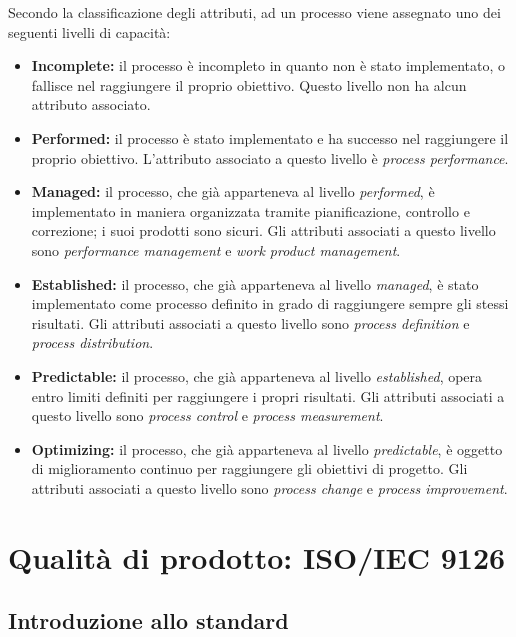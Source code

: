 \documentclass[openany,12pt,a4paper]{report}
\begin{document}
Secondo la classificazione degli attributi, ad un processo viene assegnato uno dei seguenti livelli di capacità:

\begin{itemize}
    \item \textbf{Incomplete:} il processo è incompleto in quanto non è stato implementato, o fallisce nel raggiungere il proprio obiettivo. Questo livello non ha alcun attributo associato.
    \item \textbf{Performed:} il processo è stato implementato e ha successo nel raggiungere il proprio obiettivo. L'attributo associato a questo livello è \textit{process performance}.
    \item \textbf{Managed:} il processo, che già apparteneva al livello \textit{performed}, è implementato in maniera organizzata tramite pianificazione, controllo e correzione; i suoi prodotti sono sicuri. Gli attributi associati a questo livello sono \textit{performance management} e \textit{work product management}.
    \item \textbf{Established:} il processo, che già apparteneva al livello \textit{managed}, è stato implementato come processo definito in grado di raggiungere sempre gli stessi risultati. Gli attributi associati a questo livello sono \textit{process definition} e \textit{process distribution}.
    \item \textbf{Predictable:} il processo, che già apparteneva al livello \textit{established}, opera entro limiti definiti per raggiungere i propri risultati. Gli attributi associati a questo livello sono \textit{process control} e \textit{process measurement}.
    \item \textbf{Optimizing:} il processo, che già apparteneva al livello \textit{predictable}, è oggetto di miglioramento continuo per raggiungere gli obiettivi di progetto. Gli attributi associati a questo livello sono \textit{process change} e \textit{process improvement}.
\end{itemize}

    
\section{Qualità di prodotto: ISO/IEC 9126}    

\subsection{Introduzione allo standard}
\end{document}
